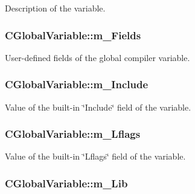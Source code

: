 Description of the variable. 

\hypertarget{classCGlobalVariable_a3dddbf794ac1de89bddcc79f2e645e55}{
\subsubsection[{m\-\_\-\-Fields}]{\setlength{\rightskip}{0pt plus 5cm}C\-Global\-Variable\-::m\-\_\-\-Fields\hspace{0.3cm}{\ttfamily [private]}}}\label{classCGlobalVariable_a3dddbf794ac1de89bddcc79f2e645e55}


User-\/defined fields of the global compiler variable. 

\hypertarget{classCGlobalVariable_a31bf0d3eb6a89b83810c14014da3da4b}{
\subsubsection[{m\-\_\-\-Include}]{\setlength{\rightskip}{0pt plus 5cm}C\-Global\-Variable\-::m\-\_\-\-Include\hspace{0.3cm}{\ttfamily [private]}}}\label{classCGlobalVariable_a31bf0d3eb6a89b83810c14014da3da4b}


Value of the built-\/in \char`\"{}\-Include\char`\"{} field of the variable. 

\hypertarget{classCGlobalVariable_a2a7041fe1f22113872e9ca4d91a65889}{
\subsubsection[{m\-\_\-\-Lflags}]{\setlength{\rightskip}{0pt plus 5cm}C\-Global\-Variable\-::m\-\_\-\-Lflags\hspace{0.3cm}{\ttfamily [private]}}}\label{classCGlobalVariable_a2a7041fe1f22113872e9ca4d91a65889}


Value of the built-\/in \char`\"{}\-Lflags\char`\"{} field of the variable. 

\hypertarget{classCGlobalVariable_acea43fe8f3fb15c77a8853259acb713e}{
\subsubsection[{m\-\_\-\-Lib}]{\setlength{\rightskip}{0pt plus 5cm}C\-Global\-Variable\-::m\-\_\-\-Lib\hspace{0.3cm}{\ttfamily [private]}}}\label{classCGlobalVariable_acea43fe8f3fb15c77a8853259acb713e}



